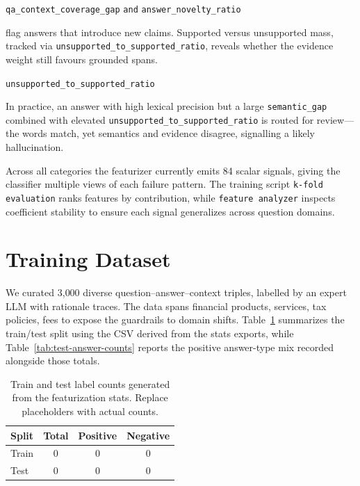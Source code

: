 \documentclass[11pt]{article}
\begin{document}
\begin{itemize}
  \begin{center}
  \texttt{qa\_context\_coverage\_gap} \quad \texttt{and} \quad \texttt{answer\_novelty\_ratio}
  \end{center}
  flag answers that introduce new claims. Supported versus unsupported mass, tracked via \texttt{unsupported\allowbreak\_to\allowbreak\_supported\allowbreak\_ratio}, reveals whether the evidence weight still favours grounded spans.\par\smallskip\centerline{\texttt{unsupported\_to\_supported\_ratio}}\par\smallskip In practice, an answer with high lexical precision but a large \texttt{semantic\_gap} combined with elevated \texttt{unsupported\_to\_supported\_ratio} is routed for review—the words match, yet semantics and evidence disagree, signalling a likely hallucination.
\end{itemize}
Across all categories the featurizer currently emits 84 scalar signals, giving the classifier multiple views of each failure pattern. The training script \texttt{k-fold evaluation} ranks features by contribution, while \texttt{feature analyzer} inspects coefficient stability to ensure each signal generalizes across question domains.

\section{Training Dataset}
We curated 3{,}000 diverse question--answer--context triples, labelled by an expert LLM with rationale traces. The data spans financial products, services, tax policies, fees to expose the guardrails to domain shifts. Table~\ref{tab:train-test-stats} summarizes the train/test split using the CSV derived from the stats exports, while Table~\ref{tab:test-answer-counts} reports the positive answer-type mix recorded alongside those totals.

\begin{table}[ht]
  \centering
  \renewcommand{\arraystretch}{1.2}
  \begin{tabular}{@{}lccc@{}}
    \toprule
    \textbf{Split} & \textbf{Total} & \textbf{Positive} & \textbf{Negative} \\
    \midrule
    Train & 0 & 0 & 0 \\
    Test & 0 & 0 & 0 \\
    \bottomrule
  \end{tabular}
  \caption{Train and test label counts generated from the featurization stats. Replace placeholders with actual counts.}
  \label{tab:train-test-stats}
\end{table}
\end{document}
